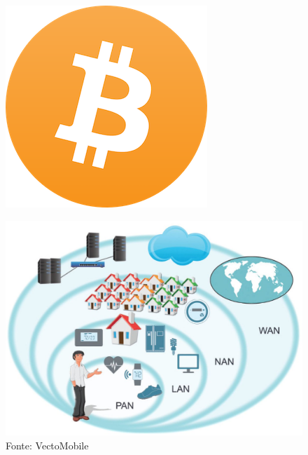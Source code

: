 \begin{frame}{}
\begin{figure}
\begin{minipage}{.5\textwidth}
          \label{figure:facebook}
        \end{minipage}%
        \begin{minipage}{.5\textwidth}
          \centering
          \includegraphics[width=.5\linewidth]{img/proj_tcc/bitcoin.png}
          \label{figure:cloudflare}
        \end{minipage}
    \end{figure}
\end{frame}

\begin{frame}{}
	\begin{figure}
		\caption{}
		\includegraphics[width = 0.8\linewidth]{img/proj_tcc/iot_network.jpg}\\
		\tiny Fonte: VectoMobile
	\end{figure}
\end{frame}


